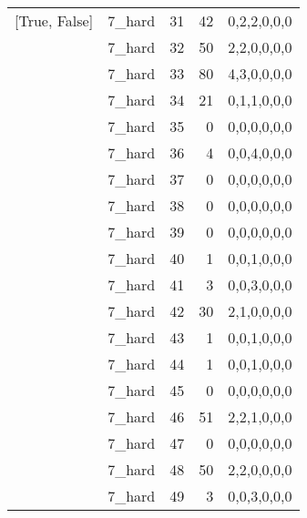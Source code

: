 \begin{tabular}{llrrl}
 [True, False]   & 7\_hard              &            31 &                    42 & 0,2,2,0,0,0   \\
 [True, False]   & 7\_hard              &            32 &                    50 & 2,2,0,0,0,0   \\
 [True, False]   & 7\_hard              &            33 &                    80 & 4,3,0,0,0,0   \\
 [True, False]   & 7\_hard              &            34 &                    21 & 0,1,1,0,0,0   \\
 [True, False]   & 7\_hard              &            35 &                     0 & 0,0,0,0,0,0   \\
 [True, False]   & 7\_hard              &            36 &                     4 & 0,0,4,0,0,0   \\
 [True, False]   & 7\_hard              &            37 &                     0 & 0,0,0,0,0,0   \\
 [True, False]   & 7\_hard              &            38 &                     0 & 0,0,0,0,0,0   \\
 [True, False]   & 7\_hard              &            39 &                     0 & 0,0,0,0,0,0   \\
 [True, False]   & 7\_hard              &            40 &                     1 & 0,0,1,0,0,0   \\
 [True, False]   & 7\_hard              &            41 &                     3 & 0,0,3,0,0,0   \\
 [True, False]   & 7\_hard              &            42 &                    30 & 2,1,0,0,0,0   \\
 [True, False]   & 7\_hard              &            43 &                     1 & 0,0,1,0,0,0   \\
 [True, False]   & 7\_hard              &            44 &                     1 & 0,0,1,0,0,0   \\
 [True, False]   & 7\_hard              &            45 &                     0 & 0,0,0,0,0,0   \\
 [True, False]   & 7\_hard              &            46 &                    51 & 2,2,1,0,0,0   \\
 [True, False]   & 7\_hard              &            47 &                     0 & 0,0,0,0,0,0   \\
 [True, False]   & 7\_hard              &            48 &                    50 & 2,2,0,0,0,0   \\
 [True, False]   & 7\_hard              &            49 &                     3 & 0,0,3,0,0,0   \\

\end{tabular}
